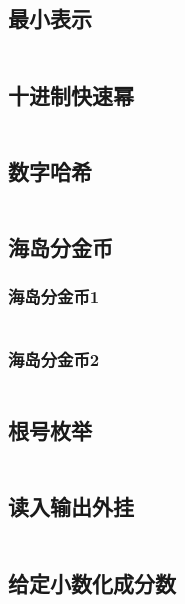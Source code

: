 \documentclass{article}
\begin{document}
\subsection{最小表示}
\inputminted[breaklines]{c++}{../其他/最小表示.cpp}

\subsection{十进制快速幂}
\inputminted[breaklines]{c++}{../其他/十进制快速幂.cpp}

\subsection{数字哈希}
\inputminted[breaklines]{c++}{../其他/数字哈希.cpp}

\subsection{海岛分金币}
\subsubsection{海岛分金币1}
\inputminted[breaklines]{c++}{../其他/海岛分金币1.cpp}

\subsubsection{海岛分金币2}
\inputminted[breaklines]{c++}{../其他/海岛分金币2.cpp}

\subsection{根号枚举}
\inputminted[breaklines]{c++}{../其他/根号枚举.cpp}

\subsection{读入输出外挂}
\inputminted[breaklines]{c++}{../其他/读入输出外挂.cpp}

\subsection{给定小数化成分数}
\inputminted[breaklines]{python}{../其他/给定小数化成分数.py}

\end{document}
